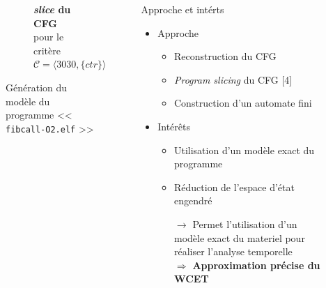 \documentclass[final]{beamer}
\begin{document}
\begin{frame}
\begin{columns}[t]
\begin{column}{.66\linewidth}
\begin{figure}[ht]
\begin{subfigure}{.30\textwidth}
            \captionsetup{justification=centering}
            \caption{\textbf{\emph{slice} du CFG} pour le critère \\
              $\mathcal{C} = \langle 3030, \{ ctr \} \rangle$}
            \label{fig:slice2}
          \end{subfigure}
          \caption{Génération du modèle du programme << \texttt{fibcall-O2.elf} >>}
        \end{figure}
      \end{column}
      \begin{column}{.33\linewidth}
        \begin{block}{Approche et intérts}
          \begin{itemize}
            \item Approche
              \begin{itemize}
                \item Reconstruction du CFG
                \item \emph{Program slicing} du CFG {\color{jdocgreen1}[4]}
                \item Construction d'un automate fini
              \end{itemize}
              \vspace{.5em}
          
              \item Intérêts
                \begin{itemize}
                  \item Utilisation d'un modèle exact du programme
                  \item Réduction de l'espace d'état engendré \\
                    \begin{center}
                      $\rightarrow$ Permet l'utilisation d'un modèle exact du materiel pour réaliser l'analyse temporelle \\
                      \vspace{.5em}
                      $\Rightarrow$ \textbf{Approximation précise du WCET}
                    \end{center}
                \end{itemize}
          \end{itemize}
        \end{block}
      \end{column}
    \end{columns}
    

\end{frame}
\end{document}
